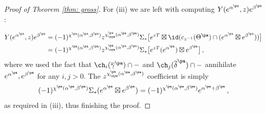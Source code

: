 \begin{proof}[Proof of Theorem \ref{thm: gross}]
For (iii) we are left with computing $Y(e^{\alpha^{\pa}},z)e^{\beta^{\pa}}$:

\begin{align*} Y(e^{\alpha^{\pa}},z)e^{\beta^{\pa}}
&= (-1)^{\chi^{\pa}(\alpha^{\pa},\beta^{\pa})}z^{\chi_\sym^{\pa}(\alpha^{\pa},\beta^{\pa})}\Sigma_*\big[e^{zT}\boxtimes \id (c_{z^{-1}}(\Theta^{\pa})\cap (e^{\alpha^{\pa}}\boxtimes e^{\beta^{\pa}}))\big]\\
&=(-1)^{\chi^{\pa}(\alpha^{\pa},\beta^{\pa})}z^{\chi_\sym^{\pa}(\alpha^{\pa},\beta^{\pa})}\Sigma_*\big[e^{zT}(e^{\alpha^{\pa}})\boxtimes  e^{\beta^{\pa}}\big]\,,
\end{align*}
where we used the fact that $\ch_i(\overline \gamma^{\pa})\cap -$ and $\ch_j(\overline \delta^{\pa})\cap -$ annihilate $e^{\alpha^{\pa}}, e^{\beta^{\pa}}$ for any $i,j>0$. The $z^{\chi_\sym^{\pa}(\alpha^{\pa},\beta^{\pa})}$ coefficient is simply
\[(-1)^{\chi^{\pa}(\alpha^{\pa},\beta^{\pa})}\Sigma_*(e^{\alpha^{\pa}}\boxtimes e^{\beta^{\pa}})=(-1)^{\chi^{\pa}(\alpha^{\pa},\beta^{\pa})}e^{\alpha^{\pa}+\beta^{\pa}}\,,\]
as required in (iii), thus finishing the proof.\qedhere
\end{proof}




